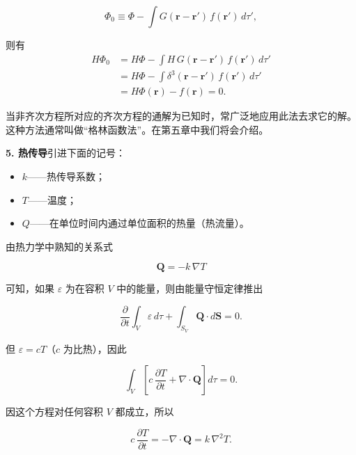 \documentclass[11pt,a4paper,oneside]{ctexbook}
\newcommand{\ve}[1]{\bm{#1}}
\begin{document}
\begin{equation*}
\Phi_0 \equiv \Phi - \int G(\ve{r} - \ve{r}')\, f(\ve{r}')\, d\tau',
\end{equation*}

则有
\begin{equation*}
\begin{aligned}
H\Phi_0 &= H\Phi - \int H\, G(\ve{r} - \ve{r}')\, f(\ve{r}')\, d\tau'\\
&= H\Phi - \int \delta^{3}(\ve{r} - \ve{r}')\, f(\ve{r}')\, d\tau'\\
&= H\Phi(\ve{r}) - f(\ve{r}) = 0.
\end{aligned}
\end{equation*}

当非齐次方程所对应的齐次方程的通解为已知时，常广泛地应用此法去求它的解。这种方法通常叫做“格林函数法”。在第五章中我们将会介绍。

\textbf{5. 热传导}\quad 引进下面的记号：

\begin{itemize}[leftmargin=2.5em,itemsep=1pt]
\item $k$——热传导系数；
\item $T$——温度；
\item $Q$——在单位时间内通过单位面积的热量（热流量）。
\end{itemize}

由热力学中熟知的关系式

\begin{equation*}
\ve{Q} = -k\, \nabla T
\end{equation*}

可知，如果 $\varepsilon$ 为在容积 $V$ 中的能量，则由能量守恒定律推出

\begin{equation*}
\frac{\partial}{\partial t} \int_{V} \varepsilon\, d\tau + \int_{S_V} \ve{Q} \cdot d\ve{S} = 0.
\end{equation*}

但 $\varepsilon = cT$（$c$ 为比热），因此

\begin{equation*}
\int_{V} \left[c\, \frac{\partial T}{\partial t} + \nabla \cdot \ve{Q}\right] d\tau = 0.
\end{equation*}

因这个方程对任何容积 $V$ 都成立，所以

\begin{equation*}
c\, \frac{\partial T}{\partial t} = -\nabla \cdot \ve{Q} = k\, \nabla^{2} T.
\end{equation*}
\end{document}

